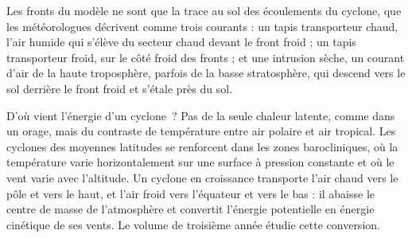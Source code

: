 \begin{omfigure}
\par{}
\end{omfigure}

Les fronts du modèle ne sont que la trace au sol des écoulements du cyclone, que les météorologues décrivent
comme trois courants : un tapis transporteur chaud, l'air humide qui s'élève
du secteur chaud devant le front froid ; un tapis transporteur froid, sur le côté froid des fronts ; et une
intrusion sèche, un courant d'air de la haute troposphère, parfois de la basse stratosphère, qui descend vers
le sol derrière le front froid
et s'étale près du sol.

D'où vient l'énergie d'un cyclone~? Pas de la seule chaleur latente, comme dans un orage,
mais du contraste de température entre air polaire et air tropical. Les cyclones des moyennes latitudes
se renforcent dans les zones barocliniques, où la température varie horizontalement sur une surface à pression
constante et où le vent varie avec l'altitude. Un cyclone en croissance transporte l'air chaud vers le pôle et
vers le haut, et l'air froid vers l'équateur et vers le bas : il abaisse le centre de masse de l'atmosphère
et convertit l'énergie potentielle en énergie cinétique de ses vents. Le volume de troisième année
étudie cette conversion.

